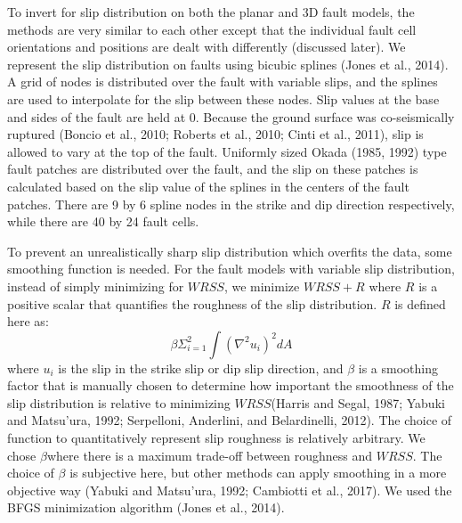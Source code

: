 \documentclass[11pt]{article}
\begin{document}
To invert for slip distribution on both the planar and 3D fault models,
the methods are very similar to each other except that the individual
fault cell orientations and positions are dealt with differently
(discussed later). We represent the slip distribution on faults using
bicubic splines (Jones et al., 2014). A grid of nodes is distributed
over the fault with variable slips, and the splines are used to
interpolate for the slip between these nodes. Slip values at the base
and sides of the fault are held at 0. Because the ground surface was
co-seismically ruptured (Boncio et al., 2010; Roberts et al., 2010;
Cinti et al., 2011), slip is allowed to vary at the top of the fault.
Uniformly sized Okada (1985, 1992) type fault patches are distributed
over the fault, and the slip on these patches is calculated based on the
slip value of the splines in the centers of the fault patches. There are
9 by 6 spline nodes in the strike and dip direction respectively, while
there are 40 by 24 fault cells.

To prevent an unrealistically sharp slip distribution which overfits the
data, some smoothing function is needed. For the fault models with
variable slip distribution, instead of simply minimizing for \(WRSS\),
we minimize \(WRSS+R\) where \(R\) is a positive scalar that quantifies
the roughness of the slip distribution. \(R\) is defined here as:
\[\beta\Sigma_{i=1}^{2} \int \left( \nabla ^2 u_{i} \right)^{2} dA\]
where \(u_i\) is the slip in the strike slip or dip slip direction, and
\(\beta\) is a smoothing factor that is manually chosen to determine how
important the smoothness of the slip distribution is relative to
minimizing \(WRSS\)(Harris and Segal, 1987; Yabuki and Matsu'ura, 1992;
Serpelloni, Anderlini, and Belardinelli, 2012). The choice of function
to quantitatively represent slip roughness is relatively arbitrary. We
chose \(\beta\)where there is a maximum trade-off between roughness and
\(WRSS\). The choice of \(\beta\) is subjective here, but other methods
can apply smoothing in a more objective way (Yabuki and Matsu'ura, 1992;
Cambiotti et al., 2017). We used the BFGS minimization algorithm (Jones
et al., 2014).
\end{document}
